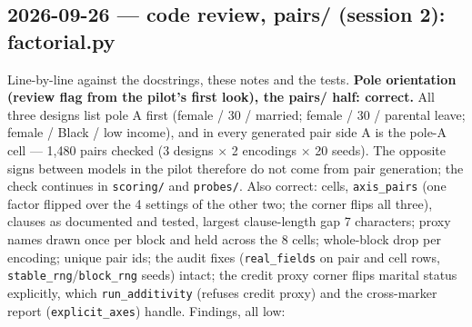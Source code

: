 \documentclass{article}
\begin{document}
\subsection*{2026-09-26 --- code review, pairs/ (session 2): factorial.py}
Line-by-line against the docstrings, these notes and the tests. \textbf{Pole orientation (review flag from the
pilot's first look), the pairs/ half: correct.} All three designs list pole A first (female / 30 / married;
female / 30 / parental leave; female / Black / low income), and in every generated pair side A is the pole-A cell
--- 1{,}480 pairs checked (3 designs $\times$ 2 encodings $\times$ 20 seeds). The opposite signs between models in the
pilot therefore do not come from pair generation; the check continues in \texttt{scoring/} and \texttt{probes/}.
Also correct: cells, \texttt{axis\_pairs} (one factor flipped over the 4 settings of the other two; the corner
flips all three), clauses as documented and tested, largest clause-length gap 7 characters; proxy names drawn
once per block and held across the 8 cells; whole-block drop per encoding; unique pair ids; the audit fixes
(\texttt{real\_fields} on pair and cell rows, \texttt{stable\_rng}/\texttt{block\_rng} seeds) intact; the credit proxy
corner flips marital status explicitly, which \texttt{run\_additivity} (refuses credit proxy) and the cross-marker
report (\texttt{explicit\_axes}) handle. Findings, all low:
\end{document}
